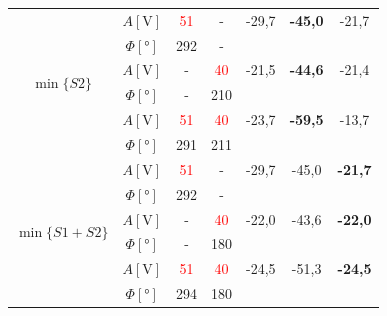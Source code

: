 \documentclass[polish,a4paper,11pt]{mwart}
\begin{document}
\begin{table}[!tbh]
\begin{tabular}{|c|c|c|c|c|c|c|}
    \multirow{6}{*}{$\min\{S2\}$}      &   $A [\si{\V}]$ & \textcolor{red}{51} & - & -29,7 & \textbf{-45,0} & -21,7 \\\cline{2-7}
				       &$\Phi [\si{\degree}]$ & 292 & - & \multicolumn{3}{c}{}\\\cline{2-7}
				       &   $A [\si{\V}]$ & - & \textcolor{red}{40} & -21,5 & \textbf{-44,6} & -21,4 \\\cline{2-7}
				       &$\Phi [\si{\degree}]$ & - & 210 & \multicolumn{3}{c}{}\\\cline{2-7}
				       &   $A [\si{\V}]$ & \textcolor{red}{51} & \textcolor{red}{40} & -23,7 & \textbf{-59,5} & -13,7\\\cline{2-7}
				       &$\Phi [\si{\degree}]$ & 291 & 211 & \multicolumn{3}{c}{}\\\hline
    \multirow{6}{*}{$\min\{S1+S2\}$}   &   $A [\si{\V}]$ & \textcolor{red}{51} & - & -29,7 & -45,0 & \textbf{-21,7}\\\cline{2-7}
				       &$\Phi [\si{\degree}]$ & 292 & - & \multicolumn{3}{c}{}\\\cline{2-7}
				       &   $A [\si{\V}]$ & - & \textcolor{red}{40} & -22,0 & -43,6 & \textbf{-22,0} \\\cline{2-7}
				       &$\Phi [\si{\degree}]$ & - & 180 & \multicolumn{3}{c}{}\\\cline{2-7}
				       &   $A [\si{\V}]$ & \textcolor{red}{51} & \textcolor{red}{40} & -24,5 & -51,3 & \textbf{-24,5} \\\cline{2-7}
				       &$\Phi [\si{\degree}]$ & 294 & 180 & \multicolumn{3}{c}{}\\\cline{1-4}
  \end{tabular}
\end{table}
\end{document}
